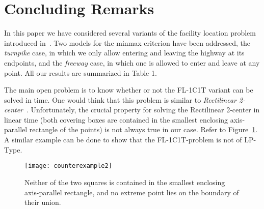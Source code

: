 \documentclass{llncs}
\begin{document}
\section{Concluding Remarks}\label{conclu}
In this paper we have considered several variants of the facility location problem introduced in~\cite{espejo11}.
Two models for the minmax criterion have been addressed,  the {\em turnpike} case, in which we only allow entering and leaving the highway at its
endpoints, and the  {\em freeway} case, in which one is allowed to enter and leave at any
point. All our results are summarized in Table 1.

The main open problem is to know whether or not the FL-1C1T variant can be solved in  time. One would think that this problem is similar to  {\em Rectilinear 2-center}~\cite{sergey,drezner87}. Unfortunately, the crucial property for solving the Rectilinear 2-center in
linear time (both covering boxes are contained in
the smallest enclosing axis-parallel rectangle of the
points) is not always true in our case. Refer to Figure~\ref{fig:counterexample}. A similar example can be done to show that the FL-1C1T-problem is not of LP-Type.

\begin{figure}[htb]
    \centering
    \texttt{[image: counterexample2]}
    \caption{\small{Neither of the two squares is contained in the smallest enclosing
axis-parallel rectangle, and no extreme point lies on the boundary of their union.}}
    \label{fig:counterexample}
\end{figure}






{}

\end{document}
